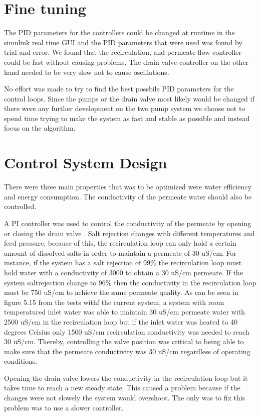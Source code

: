 \section{Fine tuning}

The PID parameters for the controllers could be changed at runtime in the simulink real time GUI and the PID parameters that were used was found by trial and error. We found that the recirculation, and permeate flow controller could be fast without causing problems. The drain valve controller on the other hand needed to be very slow not to cause oscillations. 

No effort was made to try to find the best possbile PID parameters for the control loops. Since the pumps or the drain valve most likely would be changed if there were any further development on the two pump system we choose not to spend time trying to make the system as fast and stable as possible and instead focus on the algorithm. 

\section{Control System Design}

There were three main properties that was to be optimized were water efficiency and energy consumption. The conductivity of the permeate water should also be controlled.

A PI controller was used to control the conductivity of the permeate by opening or closing the drain valve . Salt rejection changes with different temperatures and feed pressure, because of this, the recirculation loop can only hold a certain amount of dissolved salts in order to maintain a permeate of 30 uS/cm. For instance, if the system has a salt rejection of 99\% the recirculation loop must hold water with a conductivity of 3000 to obtain a 30 uS/cm permeate. If the system saltrejection change to 96\% then the conductivity in the recirculation loop must be 750 uS/cm to achieve the same permeate quality. As can be seen in figure 5.15 from the tests withf the current system, a system with room temperatured inlet water was able to maintain 30 uS/cm permeate water with 2500 uS/cm in the recirculation loop but if the inlet water was heated to 40 degrees Celsius only 1500 uS/cm recirculation conductivity was needed to reach 30 uS/cm. Thereby, controlling the valve position was critical to being able to make sure that the permeate conductivity was 30 uS/cm regardless of operating conditions. 

Opening the drain valve lowers the conductivity in the recirculation loop but it takes time to reach a new steady state. This caused a problem because if the changes were not slowely the system would overshoot. The only was to fix this problem was to use a slower controller.

